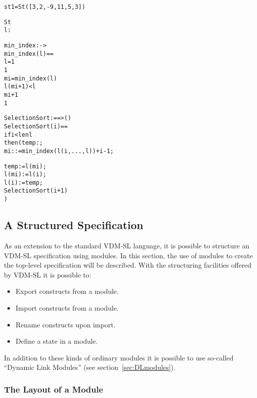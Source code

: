 \documentclass[\pformat,12pt]{article}
\begin{document}
\begin{alltt}

    st1 = St([3,2,-9,11,5,3])

   St 
    l:


  min_index :  -> 
  min_index(l) ==
      l = 1
     1
      mi = min_index( l)
          l(mi+1) <  l
           mi+1
           1


  SelectionSort :  ==> ()
  SelectionSort (i) ==
    if i < len l
    then ( temp: ;
           mi :  := min_index(l(i,..., l)) + i - 1;
         
          temp := l(mi);
          l(mi) := l(i);
          l(i) := temp;
          SelectionSort(i+1)
         )
\end{alltt}





\subsection{A Structured Specification}

As an extension to the standard VDM-SL language, it is possible to
structure an  VDM-SL specification using modules. In this section,
the use of modules to create the top-level specification will be described.
With the structuring facilities offered by  VDM-SL it is possible to:
\begin{itemize}
\item Export constructs from a module.
\item Import constructs from a module.
\item Rename constructs upon import.
\item Define a state in a module.
\end{itemize}

In addition to these kinds of ordinary modules it is possible to use
so-called ``Dynamic Link Modules'' (see section~\ref{sec:DLmodules}).

\subsubsection{The Layout of a Module}
\end{document}
